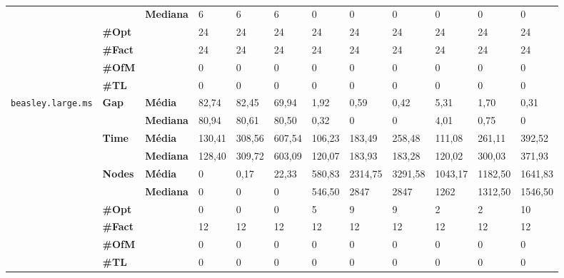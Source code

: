 \begin{table}[]
\begin{adjustbox}{angle=90}
\begin{tabular}{cll|lll|lll|lll}
 & & \textbf{Mediana} & 6 & 6 & 6 & 0 & 0 & 0 & 0 & 0 & 0 \\
\cline{2-12}
 & \textbf{\#Opt} & & 24 & 24 & 24 & 24 & 24 & 24 & 24 & 24 & 24 \\
 & \textbf{\#Fact} & & 24 & 24 & 24 & 24 & 24 & 24 & 24 & 24 & 24 \\
 & \textbf{\#OfM} & & 0 & 0 & 0 & 0 & 0 & 0 & 0 & 0 & 0 \\
 & \textbf{\#TL} & & 0 & 0 & 0 & 0 & 0 & 0 & 0 & 0 & 0 \\
\hline
\multirow{7}{*}{\texttt{beasley.large.ms}} & \multirow{2}{*}{\textbf{Gap}} & \textbf{Média} & 82,74 & 82,45 & 69,94 & 1,92 & 0,59 & 0,42 & 5,31 & 1,70 & 0,31 \\
 & & \textbf{Mediana} & 80,94 & 80,61 & 80,50 & 0,32 & 0 & 0 & 4,01 & 0,75 & 0 \\
\cline{2-12}
 & \multirow{2}{*}{\textbf{Time}} & \textbf{Média} & 130,41 & 308,56 & 607,54 & 106,23 & 183,49 & 258,48 & 111,08 & 261,11 & 392,52 \\
 & & \textbf{Mediana} & 128,40 & 309,72 & 603,09 & 120,07 & 183,93 & 183,28 & 120,02 & 300,03 & 371,93 \\
\cline{2-12}
 & \multirow{2}{*}{\textbf{Nodes}} & \textbf{Média} & 0 & 0,17 & 22,33 & 580,83 & 2314,75 & 3291,58 & 1043,17 & 1182,50 & 1641,83 \\
 & & \textbf{Mediana} & 0 & 0 & 0 & 546,50 & 2847 & 2847 & 1262 & 1312,50 & 1546,50 \\
\cline{2-12}
 & \textbf{\#Opt} & & 0 & 0 & 0 & 5 & 9 & 9 & 2 & 2 & 10 \\
 & \textbf{\#Fact} & & 12 & 12 & 12 & 12 & 12 & 12 & 12 & 12 & 12 \\
 & \textbf{\#OfM} & & 0 & 0 & 0 & 0 & 0 & 0 & 0 & 0 & 0 \\
 & \textbf{\#TL} & & 0 & 0 & 0 & 0 & 0 & 0 & 0 & 0 & 0 \\
	\end{tabular}
	\end{adjustbox}
	\label{cflp:tab:6}
	\caption{}
\end{table}

